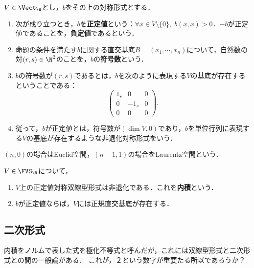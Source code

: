 \documentclass[uplatex, dvipdfmx]{jsreport}
\begin{document}
\begin{definition}
    $V\in\Vect_\R$とし，$b$をその上の対称形式とする．
    \begin{enumerate}
        \item 次が成り立つとき，$b$を\textbf{正定値}という：$\forall x\in V\setminus\{0\},\;b(x,x)>0$．$-b$が正定値であることを，\textbf{負定値}であるという．
        \item 命題の条件を満たす$b$に関する直交基底$B=(x_1,\cdots,x_n)$について，自然数の対$(r,s)\in\N^2$のことを，$b$の\textbf{符号数}という．
        \item $b$の符号数が$(r,s)$であるとは，$b$を次のように表現する$V$の基底が存在するということである：\[\begin{pmatrix}1_r&0&0\\0&-1_s&0\\0&0&0\end{pmatrix}.\]
        \item 従って，$b$が正定値とは，符号数が$(\dim V,0)$であり，$b$を単位行列に表現する$V$の基底が存在するような非退化対称形式をいう．
    \end{enumerate}
\end{definition}
\begin{remarks}
    $(n,0)$の場合はEuclid空間，$(n-1,1)$の場合をLaurentz空間という．
\end{remarks}

\begin{proposition}[内積空間には正規直交基底が存在する]
    $V\in\FVS_\R$について，
    \begin{enumerate}
        \item $V$上の正定値対称双線型形式は非退化である．これを\textbf{内積}という．
        \item $b$が正定値ならば，$V$には正規直交基底が存在する．
    \end{enumerate}
\end{proposition}


\subsection{二次形式}

\begin{tcolorbox}[colframe=ForestGreen, colback=ForestGreen!10!white,breakable,colbacktitle=ForestGreen!40!white,coltitle=black,fonttitle=\bfseries\sffamily,
title=]
    内積をノルムで表した式を極化不等式と呼んだが，これには双線型形式と二次形式との間の一般論がある．
    これが，２という数字が重要たる所以であろうか？
\end{tcolorbox}
\end{document}
